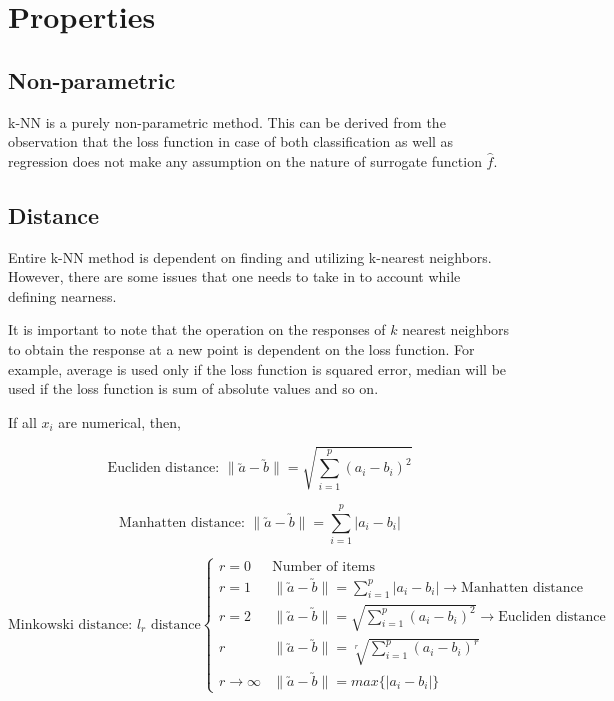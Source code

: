 \documentclass{article}
\begin{document}
\section{Properties}{
    \subsection{Non-parametric}{
        k-NN is a purely non-parametric method. This can be derived from the observation that the loss function in case of both classification as well as regression does not make any assumption on the nature of surrogate function $\hat{f}$.
    }
    \subsection{Distance}{
        Entire k-NN method is dependent on finding and utilizing k-nearest neighbors. However, there are some issues that one needs to take in to account while defining nearness. 

        It is important to note that the operation on the responses of $k$ nearest neighbors to obtain the response at a new point is dependent on the loss function. For example, average is used only if the loss function is squared error, median will be used if the loss function is sum of absolute values and so on.

        If all $x_i$ are numerical, then,

        \[\text{Eucliden distance: }\| \utilde{a} - \utilde{b}\| = \sqrt{\sum_{i=1}^{p}(a_i - b_i)^2}\]

        \[\text{Manhatten distance: }\| \utilde{a} - \utilde{b}\| = \sum_{i=1}^{p}|a_i - b_i|\]

        \[\text{Minkowski distance: } l_r \text{ distance}\begin{cases}
            r=0  &  \text{Number of items} \\
            r=1  &  \| \utilde{a} - \utilde{b}\| = \sum_{i=1}^{p}|a_i - b_i| \rightarrow \text{Manhatten distance} \\ 
            r=2  &  \| \utilde{a} - \utilde{b}\| = \sqrt{\sum_{i=1}^{p}(a_i - b_i)^2} \rightarrow \text{Eucliden distance} \\ 
            r  &  \| \utilde{a} - \utilde{b}\| = \sqrt[r]{\sum_{i=1}^{p}(a_i - b_i)^r} \\ 
            r\rightarrow \infty  &  \| \utilde{a} - \utilde{b}\| = \mathit{max} \{|a_i - b_i|\}
        \end{cases}\]
        
}}
\end{document}
